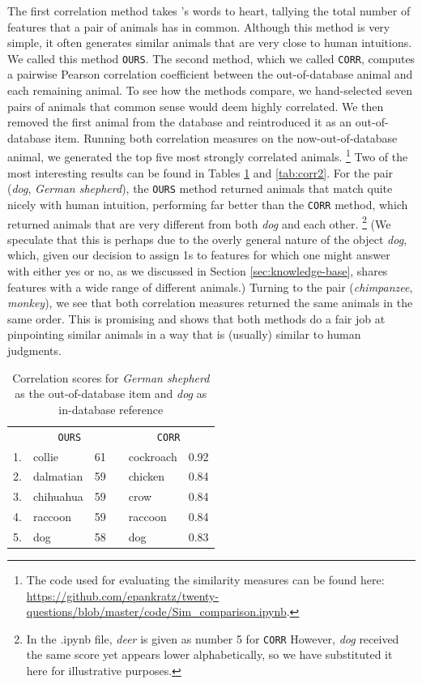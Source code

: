 \documentclass[11pt,a4paper]{article}
\begin{document}
The first correlation method takes \citeauthor{Rosch1978}'s \citeyearpar{Rosch1978} words to heart, tallying the total number of features that a pair of animals has in common. Although this method is very simple, it often generates similar animals that are very close to human intuitions. We called this method \texttt{OURS}. The second method, which we called \texttt{CORR}, computes a pairwise Pearson correlation coefficient between the out-of-database animal and each remaining animal. To see how the methods compare, we hand-selected seven pairs of animals that common sense would deem highly correlated. We then removed the first animal from the database and reintroduced it as an out-of-database item. Running both correlation measures on the now-out-of-database animal, we generated the top five most strongly correlated animals.%
    \footnote{The code used for evaluating the similarity measures can be found here:  \url{https://github.com/epankratz/twenty-questions/blob/master/code/Sim_comparison.ipynb}.}
Two of the most interesting results can be found in Tables \ref{tab:corr1} and \ref{tab:corr2}.
For the pair (\textit{dog}, \textit{German shepherd}), the \texttt{OURS} method returned animals that match quite nicely with human intuition, performing far better than the \texttt{CORR} method, which returned animals that are very different from both \textit{dog} and each other.%
    \footnote{In the .ipynb file, \textit{deer} is given as number 5 for \texttt{CORR} However, \textit{dog} received the same score yet appears lower alphabetically, so we have substituted it here for illustrative purposes.}
(We speculate that this is perhaps due to the overly general nature of the object \textit{dog}, which, given our decision to assign 1s to features for which one might answer with either yes or no, as we discussed in Section \ref{sec:knowledge-base}, shares features with a wide range of different animals.) 
Turning to the pair (\textit{chimpanzee}, \textit{monkey}), we see that both correlation measures returned the same animals in the same order. 
This is promising and shows that both methods do a fair job at pinpointing similar animals in a way that is (usually) similar to human judgments.

\begin{table}[h]
    \centering
    \begin{tabular}{clcclc}
    \toprule
    & \multicolumn{2}{c}{\texttt{OURS}} && \multicolumn{2}{c}{\texttt{CORR}} \\
    \cmidrule{2-3} \cmidrule{5-6}
    1. & collie & 61 && cockroach & 0.92 \\
    2. & dalmatian & 59 && chicken & 0.84 \\
    3. & chihuahua & 59 && crow & 0.84 \\
    4. & raccoon & 59 && raccoon & 0.84 \\
    5. & dog & 58 && dog & 0.83 \\
    \bottomrule
    \end{tabular}
\caption{Correlation scores for \textit{German shepherd} as the out-of-database item and \textit{dog} as in-database reference}
\label{tab:corr1}
\end{table}
\end{document}
